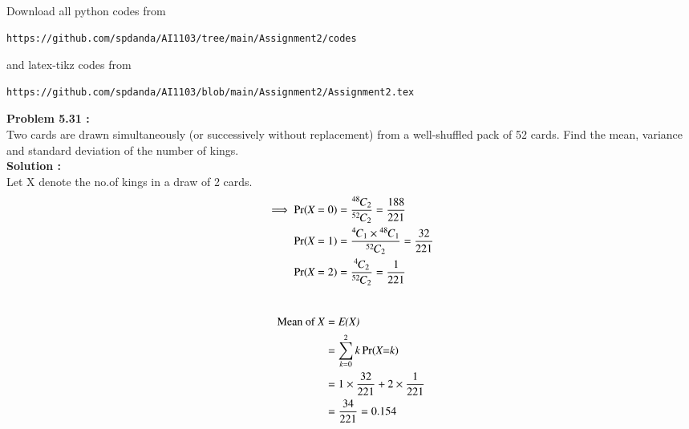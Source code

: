 \documentclass[journal,12pt,twocolumn]{IEEEtran}
\newcommand*{\permcomb}[4][0mu]{{{}^{#3}\mkern#1#2_{#4}}}
\newcommand*{\comb}[1][-1mu]{\permcomb[#1]{C}}
\begin{document}
\maketitle
\newpage
\bigskip
\renewcommand{\thefigure}{\theenumi}
\renewcommand{\thetable}{\theenumi}
Download all python codes from 
\begin{lstlisting}
https://github.com/spdanda/AI1103/tree/main/Assignment2/codes
\end{lstlisting}
%
and latex-tikz codes from 
%
\begin{lstlisting}
https://github.com/spdanda/AI1103/blob/main/Assignment2/Assignment2.tex
\end{lstlisting}
\large\textbf{Problem 5.31 :}\\
Two cards are drawn simultaneously (or successively without replacement) from a well-shuffled  pack  of  52  cards.  Find  the  mean, variance and standard deviation of the number of kings.\\
\textbf{Solution :}\\
Let X denote the no.of kings in a draw of 2 cards.
\begin{align}
\implies \Pr(\emph{X}=0) &= \dfrac{\comb{48}{2}}{\comb{52}{2}}=\dfrac{188}{221} \\
\Pr(\emph{X}=1) &= \dfrac{{\comb{4}{1}} \times {\comb{48}{1}}}{{\comb{52}{2}}}=\dfrac{32}{221} \\ 
\Pr(\emph{X}=2)&=\dfrac{\comb{4}{2}}{\comb{52}{2}}= \dfrac{1}{221}\\ \nonumber
\end{align}

\begin{center}
\begin{table}[h]
    \centering
    \caption{\large Probability distribution table }
    \label{table 1}
\end{table}
\end{center}

\newpage

\begin{align}
 \text{Mean of \emph{X}}&= \emph{E(X)} \\  
               &=\sum_{\emph{k}=0}^{2}   k\Pr(\emph{X=k})\\ 
               &=1 \times\frac{32}{221}+2 \times\frac{1}{221}\\
               &= \frac{34}{221} = 0.154\\ \nonumber
\end{align}
\end{document}
